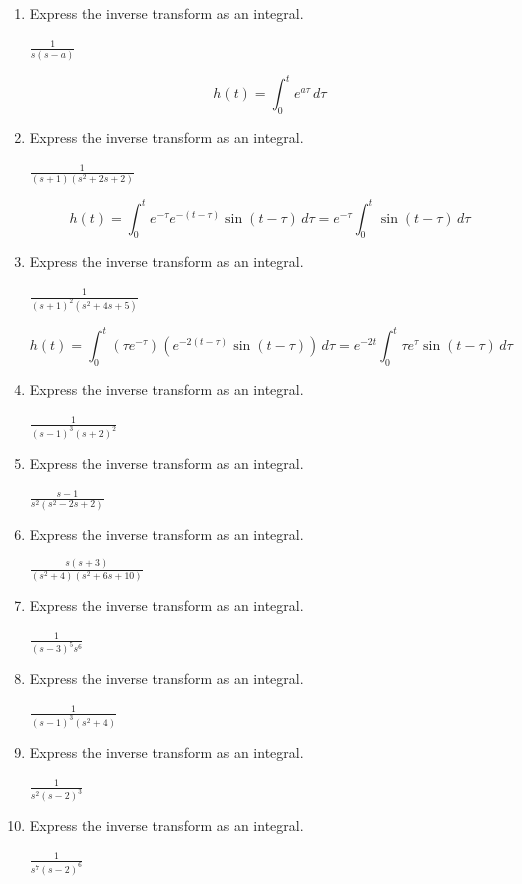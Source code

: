 \documentclass{ximera}
\begin{document}
\begin{problem}
\begin{enumerate}
\item Express the inverse transform as an integral.

$\frac{1}{s(s-a)}$

\begin{solution}
    $$h(t)= \int_0^t e^{a \tau}\,d\tau$$
\end{solution}

\item Express the inverse transform as an integral.

$\frac{1}{(s+1)(s^2+2s+2)}$

\begin{solution}
    $$h(t) = \int_0^t e^{-\tau}e^{-(t-\tau)} \sin (t-\tau)\,d\tau=e^{-\tau}\int_0^t \sin (t-\tau)\,d\tau$$
\end{solution}

\item Express the inverse transform as an integral.

$\frac{1}{(s+1)^2(s^2+4s+5)}$

\begin{solution}
    $$h(t) = \int_0^t (\tau e^{-\tau})\left(e^{-2(t-\tau)}\sin (t-\tau)\right)\, d\tau=e^{-2t}\int_0^t \tau e^\tau \sin (t-\tau)\, d\tau$$
\end{solution}

\item Express the inverse transform as an integral.

$\frac{1}{(s-1)^3(s+2)^2}$

\item Express the inverse transform as an integral.

$\frac{s-1}{s^2(s^2-2s+2)}$

\item Express the inverse transform as an integral.

$\frac{s(s+3)}{(s^2+4)(s^2+6s+10)}$

\item Express the inverse transform as an integral.

$\frac{1}{(s-3)^5s^6}$

\item Express the inverse transform as an integral.

$\frac{1}{(s-1)^3(s^2+4)}$

\item Express the inverse transform as an integral.

$\frac{1}{s^2(s-2)^3}$

\item Express the inverse transform as an integral.

$\frac{1}{s^7(s-2)^6}$
\end{enumerate}
\end{problem}
\end{document}

